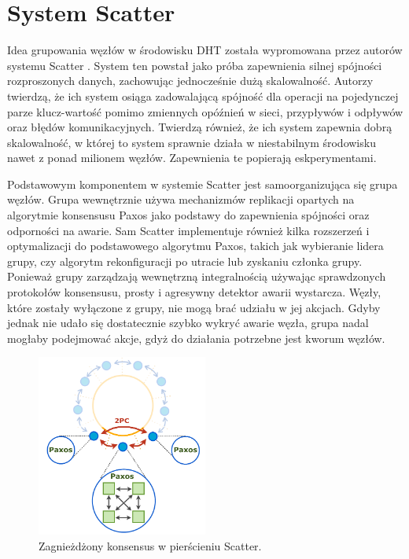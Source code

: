 \documentclass[12pt, twoside, openany]{report}
\begin{document}
\section{System Scatter}
\label{subch_scatter}
Idea grupowania węzłów w środowisku DHT została wypromowana przez autorów systemu Scatter \cite{bib:scatter}. System ten powstał jako próba zapewnienia silnej spójności rozproszonych danych,
zachowując jednocześnie dużą skalowalność. Autorzy twierdzą, że ich system osiąga zadowalającą spójność dla operacji na pojedynczej parze klucz-wartość pomimo zmiennych opóźnień w sieci, przypływów i odpływów oraz błędów komunikacyjnych. Twierdzą również, że ich system zapewnia dobrą skalowalność, w której to system sprawnie działa w niestabilnym środowisku nawet z ponad milionem węzłów. Zapewnienia te popierają eskperymentami.

Podstawowym komponentem w systemie Scatter jest samoorganizująca się grupa węzłów. Grupa wewnętrznie używa mechanizmów replikacji opartych na algorytmie konsensusu Paxos jako podstawy do zapewnienia spójności oraz odporności na awarie. Sam Scatter implementuje również kilka rozszerzeń i optymalizacji do podstawowego algorytmu Paxos, takich jak wybieranie lidera grupy, czy algorytm rekonfiguracji po utracie lub zyskaniu członka grupy.
Ponieważ grupy zarządzają wewnętrzną integralnością używając sprawdzonych protokołów konsensusu, prosty i agresywny detektor awarii wystarcza. Węzły, które zostały wyłączone z grupy, nie mogą brać udziału w jej akcjach. Gdyby jednak nie udało się dostatecznie szybko wykryć awarie węzła, grupa nadal mogłaby podejmować akcje, gdyż do działania potrzebne jest kworum węzłów.

\begin{figure}[H]
\centering
\includegraphics[width=0.5\textwidth,height=\textheight,keepaspectratio]{scatter.png}
\caption{Zagnieżdżony konsensus w pierścieniu Scatter.}
\label{fig:scatter}
\end{figure}
\end{document}
